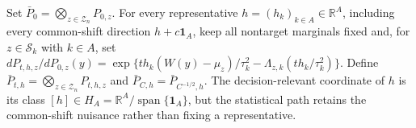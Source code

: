 Set \(\bar P_0=\bigotimes_{z\in\mathcal Z_n}P_{0,z}\).  For every representative \(h=(h_k)_{k\in A}\in\mathbb R^A\), including every common-shift direction \(h+c\mathbf 1_A\), keep all nontarget marginals fixed and, for \(z\in\mathcal S_k\) with \(k\in A\), set \(dP_{t,h,z}/dP_{0,z}(y)=\exp\{t h_k(W(y)-\mu_z)/\tau_k^2-\Lambda_{z,k}(t h_k/\tau_k^2)\}\).  Define \(\bar P_{t,h}=\bigotimes_{z\in\mathcal Z_n}P_{t,h,z}\) and \(\bar P_{C,h}=\bar P_{C^{-1/2},h}\).  The decision-relevant coordinate of \(h\) is its class \([h]\in H_A=\mathbb R^A/\operatorname{span}\{\mathbf 1_A\}\), but the statistical path retains the common-shift nuisance rather than fixing a representative.
